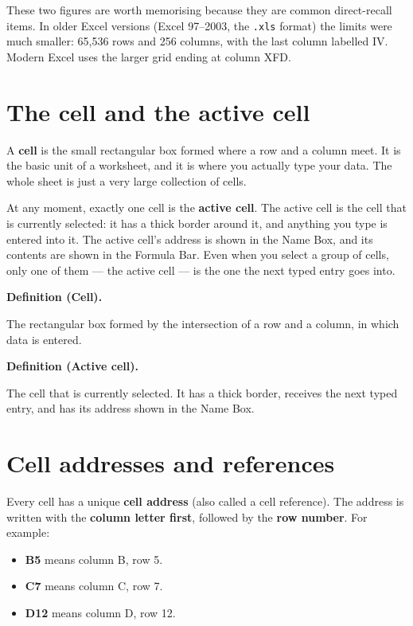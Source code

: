 \documentclass[11pt]{article}
\newenvironment{definitionbox}[1]{%
  \par\noindent\textbf{Definition (#1).}\ \itshape
}{\par\vspace{0.3em}}
\begin{document}
These two figures are worth memorising because they are common direct-recall
items. In older Excel versions (Excel 97--2003, the \texttt{.xls} format) the
limits were much smaller: 65,536 rows and 256 columns, with the last column
labelled IV. Modern Excel uses the larger grid ending at column XFD.

\section{The cell and the active cell}
A \textbf{cell} is the small rectangular box formed where a row and a column
meet. It is the basic unit of a worksheet, and it is where you actually type
your data. The whole sheet is just a very large collection of cells.

At any moment, exactly one cell is the \textbf{active cell}. The active cell
is the cell that is currently selected: it has a thick border around it, and
anything you type is entered into it. The active cell's address is shown in
the Name Box, and its contents are shown in the Formula Bar. Even when you
select a group of cells, only one of them --- the active cell --- is the one
the next typed entry goes into.

\begin{definitionbox}{Cell}
The rectangular box formed by the intersection of a row and a column, in
which data is entered.
\end{definitionbox}

\begin{definitionbox}{Active cell}
The cell that is currently selected. It has a thick border, receives the
next typed entry, and has its address shown in the Name Box.
\end{definitionbox}

\section{Cell addresses and references}
Every cell has a unique \textbf{cell address} (also called a cell
reference). The address is written with the \textbf{column letter first},
followed by the \textbf{row number}. For example:

\begin{itemize}
  \item \textbf{B5} means column B, row 5.
  \item \textbf{C7} means column C, row 7.
  \item \textbf{D12} means column D, row 12.
\end{itemize}
\end{document}
